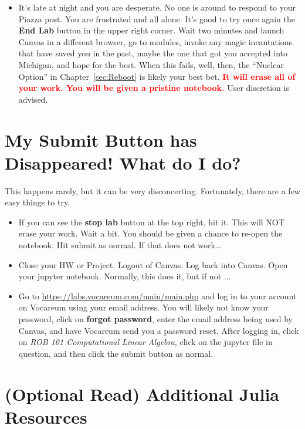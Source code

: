 \begin{itemize}
    \item It's late at night and you are desperate. No one is around to respond to your Piazza post. You are frustrated and all alone. It's good to try once again the \textbf{End Lab} button in the upper right corner. Wait two minutes and launch Canvas in a different browser, go to modules, invoke any magic incantations that have saved you in the past, maybe the one that got you accepted into Michigan, and hope for the best. When this fails, well, then, the ``Nuclear Option'' in Chapter~\ref{sec:Reboot} is likely your best bet. \textcolor{red}{\bf It will erase all of your work. You will be given a pristine notebook.} User discretion is advised. 
\end{itemize}

\section{My Submit Button has Disappeared! What do I do?}

This happens rarely, but it can be very disconcerting. Fortunately, there are a few easy things to try.
\begin{itemize}

    \item If you can see the \textbf{stop lab} button at the top right, hit it.  This will NOT erase your work. Wait a bit. You should be given a chance to re-open the notebook. Hit submit as normal. If that does not work...
    
    \item Close your HW or Project. Logout of Canvas. Log back into Canvas. Open your jupyter notebook. Normally, this does it, but if not ...

    \item Go to \url{https://labs.vocareum.com/main/main.php} and log in to your account on Vocareum using your email address. You will likely not know your password, click on \textbf{forgot password}, enter the email address being used by Canvas, and have Vocareum send you a password reset. After logging in, click on \textit{ROB 101 Computational Linear Algebra}, click on the jupyter file in question, and then click the submit button as normal.


\end{itemize}

\section{(Optional Read) Additional Julia Resources}


